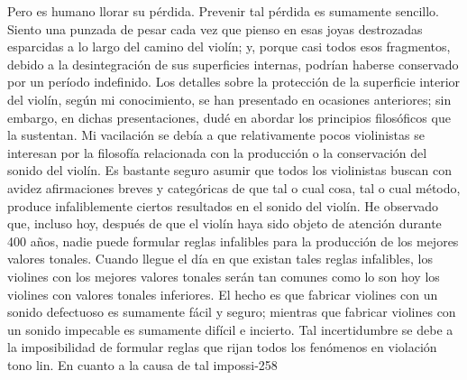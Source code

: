 Pero es humano llorar su pérdida. Prevenir tal pérdida es sumamente sencillo.
Siento una punzada de pesar cada vez que pienso en esas joyas destrozadas esparcidas a lo largo del camino del violín; y, porque casi todos esos fragmentos, debido a la desintegración de sus superficies internas, podrían haberse conservado por un período indefinido.
Los detalles sobre la protección de la superficie interior del violín, según mi conocimiento, se han presentado en ocasiones anteriores; sin embargo, en dichas presentaciones, dudé en abordar los principios filosóficos que la sustentan. Mi vacilación se debía a que relativamente pocos violinistas se interesan por la filosofía relacionada con la producción o la conservación del sonido del violín. Es bastante seguro asumir que todos los violinistas buscan con avidez afirmaciones breves y categóricas de que tal o cual cosa, tal o cual método, produce infaliblemente ciertos resultados en el sonido del violín. He observado que, incluso hoy, después de que el violín haya sido objeto de atención durante 400 años, nadie puede formular reglas infalibles para la producción de los mejores valores tonales. Cuando llegue el día en que existan tales reglas infalibles, los violines con los mejores valores tonales serán tan comunes como lo son hoy los violines con valores tonales inferiores. El hecho es que fabricar violines con un sonido defectuoso es sumamente fácil y seguro; mientras que fabricar violines con un sonido impecable es sumamente difícil e incierto. Tal incertidumbre se debe a la imposibilidad de formular reglas que rijan todos los fenómenos en violación
tono lin.	En cuanto a la causa de tal impossi-258

